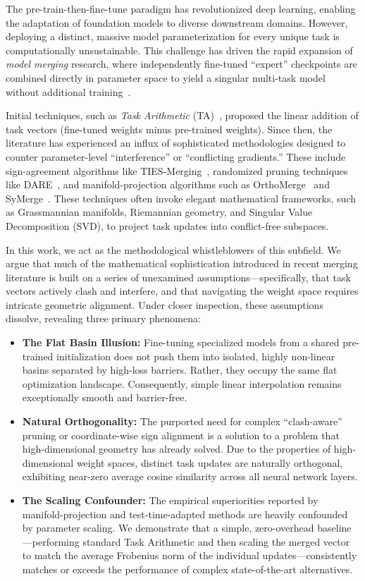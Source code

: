 \documentclass{article}
\begin{document}
The pre-train-then-fine-tune paradigm has revolutionized deep learning, enabling the adaptation of foundation models to diverse downstream domains. However, deploying a distinct, massive model parameterization for every unique task is computationally unsustainable. This challenge has driven the rapid expansion of \textit{model merging} research, where independently fine-tuned ``expert'' checkpoints are combined directly in parameter space to yield a singular multi-task model without additional training~\cite{wortsman2022robust, ilharco2022editing}.

Initial techniques, such as \textit{Task Arithmetic} (TA)~\cite{ilharco2022editing}, proposed the linear addition of task vectors (fine-tuned weights minus pre-trained weights). Since then, the literature has experienced an influx of sophisticated methodologies designed to counter parameter-level ``interference'' or ``conflicting gradients.'' These include sign-agreement algorithms like TIES-Merging~\cite{yadav2023ties}, randomized pruning techniques like DARE~\cite{yu2024dare}, and manifold-projection algorithms such as OrthoMerge~\cite{orthomerge2024} and SyMerge~\cite{symerge2023}. These techniques often invoke elegant mathematical frameworks, such as Grassmannian manifolds, Riemannian geometry, and Singular Value Decomposition (SVD), to project task updates into conflict-free subspaces.

In this work, we act as the methodological whistleblowers of this subfield. We argue that much of the mathematical sophistication introduced in recent merging literature is built on a series of unexamined assumptions—specifically, that task vectors actively clash and interfere, and that navigating the weight space requires intricate geometric alignment. Under closer inspection, these assumptions dissolve, revealing three primary phenomena:

\begin{itemize}
    \item \textbf{The Flat Basin Illusion:} Fine-tuning specialized models from a shared pre-trained initialization does not push them into isolated, highly non-linear basins separated by high-loss barriers. Rather, they occupy the same flat optimization landscape. Consequently, simple linear interpolation remains exceptionally smooth and barrier-free.
    \item \textbf{Natural Orthogonality:} The purported need for complex ``clash-aware'' pruning or coordinate-wise sign alignment is a solution to a problem that high-dimensional geometry has already solved. Due to the properties of high-dimensional weight spaces, distinct task updates are naturally orthogonal, exhibiting near-zero average cosine similarity across all neural network layers.
    \item \textbf{The Scaling Confounder:} The empirical superiorities reported by manifold-projection and test-time-adapted methods are heavily confounded by parameter scaling. We demonstrate that a simple, zero-overhead baseline—performing standard Task Arithmetic and then scaling the merged vector to match the average Frobenius norm of the individual updates—consistently matches or exceeds the performance of complex state-of-the-art alternatives.
\end{itemize}
\end{document}
